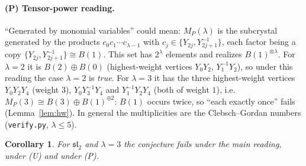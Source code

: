 \documentclass[11pt]{article}
\newtheorem{corollary}[theorem]{Corollary}
\theoremstyle{definition}
\theoremstyle{remark}
\begin{document}
\paragraph{(P) Tensor-power reading.} ``Generated by monomial variables'' could
mean: $M_P(\lambda)$ is the subcrystal generated by the products
$c_0c_1\cdots c_{\lambda-1}$ with $c_j\in\{Y_{2j},Y_{2j+1}^{-1}\}$, each factor
being a copy $\{Y_{2j},Y_{2j+1}^{-1}\}\cong B(1)$. This set has $2^\lambda$
elements and realizes $B(1)^{\otimes\lambda}$. For $\lambda=2$ it is
$B(2)\oplus B(0)$ (highest-weight vertices $Y_0Y_2$, $Y_1^{-1}Y_2$), so under this
reading the case $\lambda=2$ is \emph{true}. For $\lambda=3$ it has the three
highest-weight vertices $Y_0Y_2Y_4$ (weight $3$), $Y_0Y_3^{-1}Y_4$ and
$Y_1^{-1}Y_2Y_4$ (both of weight $1$), i.e. $M_P(3)\cong B(3)\oplus B(1)^{\oplus2}$:
$B(1)$ occurs twice, so ``each exactly once'' fails (Lemma~\ref{lem:hw}).
In general the multiplicities are the Clebsch--Gordan numbers
(\texttt{verify.py}, $\lambda\le5$).

\begin{corollary}
For $\mathfrak{sl}_2$ and $\lambda=3$ the conjecture fails under the main
reading, under (U) and under (P).
\end{corollary}
\end{document}

